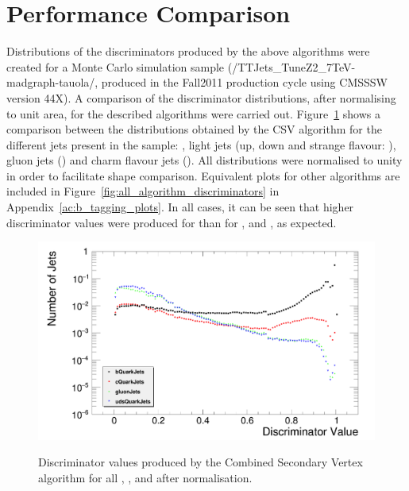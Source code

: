 \section{Performance Comparison}
\label{s:performance_comparison}

Distributions of the discriminators produced by the above algorithms were created for a \ttbar \MADGRAPH Monte
Carlo simulation sample (/TTJets\_TuneZ2\_7TeV-madgraph-tauola/, produced in the Fall2011 production cycle
using CMSSSW version 44X). A comparison of the discriminator distributions, after normalising to unit area,
for the described algorithms were carried out. Figure~\ref{fig:CSV_discriminators} shows a comparison between
the distributions obtained by the CSV algorithm for the different jets present in the sample: \bjets, light
jets (up, down and strange flavour: \udsjets), gluon jets (\gjets) and charm flavour jets (\cjets). All
distributions were normalised to unity in order to facilitate shape comparison. Equivalent plots for other
algorithms are included in Figure~\ref{fig:all_algorithm_discriminators} in Appendix~\ref{ac:b_tagging_plots}.
In all cases, it can be seen that higher discriminator values were produced for \bjets than for \udsjets,
\gjets and \cjets, as expected.

\begin{figure}[hbtp]
   \centering
     \includegraphics[width=\textwidth]{Chapters/04_Analysis/04a_BTags/Images/CombinedSecondaryVertex_norm_discriminator_combined}\\
     \caption[Discriminator values produced by the Combined Secondary Vertex algorithm after
     normalisation.]{Discriminator values produced by the Combined Secondary Vertex algorithm for all \bjets,
     \cjets, \gjets and \udsjets after normalisation.}
     \label{fig:CSV_discriminators}
\end{figure}

